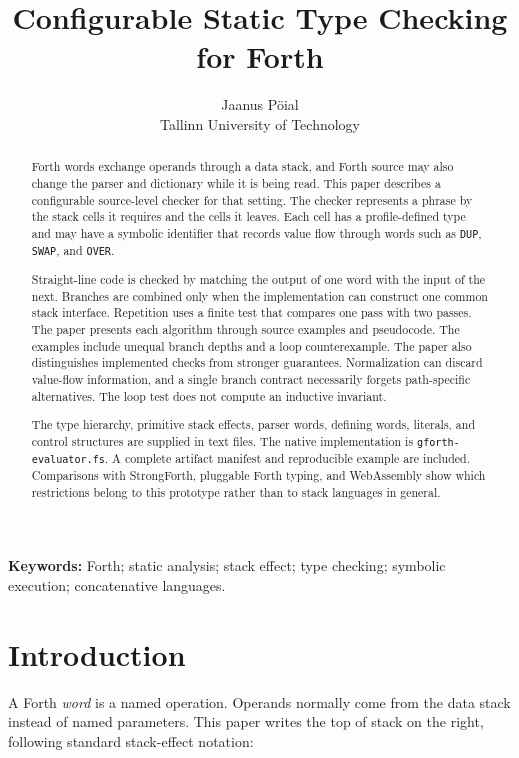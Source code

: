 \documentclass[11pt,a4paper]{article}
\title{Configurable Static Type Checking for Forth}
\author{Jaanus Pöial\\Tallinn University of Technology}
\date{}
\begin{document}
\maketitle
\thispagestyle{empty}

\begin{abstract}
Forth words exchange operands through a data stack, and Forth source may also
change the parser and dictionary while it is being read.  This paper describes
a configurable source-level checker for that setting.  The checker represents
a phrase by the stack cells it requires and the cells it leaves.  Each cell
has a profile-defined type and may have a symbolic identifier that records
value flow through words such as \texttt{DUP}, \texttt{SWAP}, and
\texttt{OVER}.

Straight-line code is checked by matching the output of one word with the
input of the next.  Branches are combined only when the implementation can
construct one common stack interface.  Repetition uses a finite test that
compares one pass with two passes.  The paper presents each algorithm through
source examples and pseudocode.  The
examples include unequal branch depths and a loop counterexample.  The paper
also distinguishes implemented checks from stronger guarantees.  Normalization
can discard value-flow information, and a single branch contract necessarily
forgets path-specific alternatives.  The loop test does not compute an
inductive invariant.

The type hierarchy, primitive stack effects, parser words, defining words,
literals, and control structures are supplied in text files.  The native
implementation is \texttt{gforth-evaluator.fs}.  A complete artifact manifest
and reproducible example are included.  Comparisons with StrongForth,
pluggable Forth typing, and WebAssembly show which restrictions belong to this
prototype rather than to stack languages in general.
\end{abstract}

\noindent\textbf{Keywords:} Forth; static analysis; stack effect; type checking;
symbolic execution; concatenative languages.

\section{Introduction}

A Forth \emph{word} is a named operation.  Operands normally come from the
data stack instead of named parameters.  This paper writes the top of stack on
the right, following standard stack-effect notation:
\end{document}
